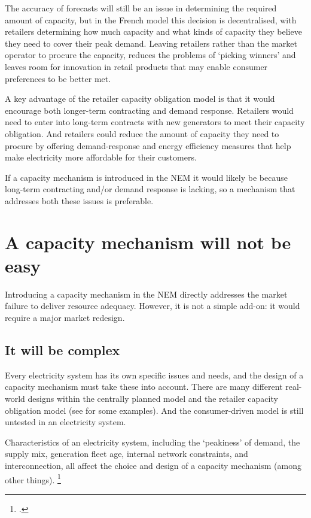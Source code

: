 \documentclass[FrontPage]{grattan}
\begin{document}
The accuracy of forecasts will still be an issue in determining the required amount of capacity, but in the French model this decision is decentralised, with retailers determining how much capacity and what kinds of capacity they believe they need to cover their peak demand. Leaving retailers rather than the market operator to procure the capacity, reduces the problems of `picking winners' and leaves room for innovation in retail products that may enable consumer preferences to be better met.

A key advantage of the retailer capacity obligation model is that it would encourage both longer-term contracting and demand response. Retailers would need to enter into long-term contracts with new generators to meet their capacity obligation. And retailers could reduce the amount of capacity they need to procure by offering demand-response and energy efficiency measures that help make electricity more affordable for their customers.

If a capacity mechanism is introduced in the NEM it would likely be because long-term contracting and/or demand response is lacking, so a mechanism that addresses both these issues is preferable.

\section{A capacity mechanism will not be easy}\label{sec:a-capacity-mechanism-will-not-be-easy}
Introducing a capacity mechanism in the NEM directly addresses the market failure to deliver resource adequacy. However, it is not a simple add-on: it would require a major market redesign.

\subsection{It will be complex}\label{subsec:a-capacity-mechanism-will-be-complex}
Every electricity system has its own specific issues and needs, and the design of a capacity mechanism must take these into account. There are many different real-world designs within the centrally planned model and the retailer capacity obligation model (see  for some examples). And the consumer-driven model is still untested in an electricity system.

Characteristics of an electricity system, including the `peakiness' of demand, the supply mix, generation fleet age, internal network constraints, and interconnection, all affect the choice and design of a capacity mechanism (among other things).%
\footcite{CIGRE2016CapacityMechanisms}
\end{document}
